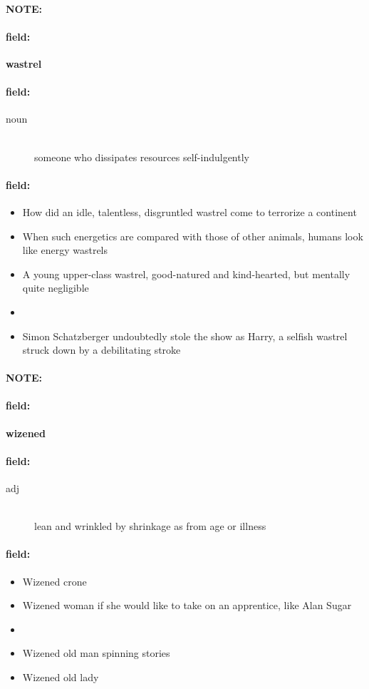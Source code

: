 \documentclass[12pt]{article}
\newenvironment{note}{\paragraph{NOTE:}}{}
\newenvironment{field}{\paragraph{field:}}{}
\begin{document}
\begin{note}
\begin{field}
\textbf{\large wastrel}
\end{field}


\begin{field}
\begin{description}
\item[noun] \hfill \\ 
someone who dissipates resources self-indulgently

\end{description}
\end{field}

\begin{field}
\begin{itemize}
\item How did an idle, talentless, disgruntled wastrel come to terrorize a continent
\item When such energetics are compared with those of other animals, humans look like energy wastrels
\item A young upper-class wastrel, good-natured and kind-hearted, but mentally quite negligible
\item 
\item Simon Schatzberger undoubtedly stole the show as Harry, a selfish wastrel struck down by a debilitating stroke
\end{itemize}
\end{field}
\end{note}
\begin{note}
\begin{field}
\textbf{\large wizened}
\end{field}


\begin{field}
\begin{description}
\item[adj] \hfill \\ 
lean and wrinkled by shrinkage as from age or illness

\end{description}
\end{field}

\begin{field}
\begin{itemize}
\item Wizened crone
\item Wizened woman if she would like to take on an apprentice, like Alan Sugar
\item 
\item Wizened old man spinning stories
\item Wizened old lady
\end{itemize}
\end{field}
\end{note}
\end{document}
